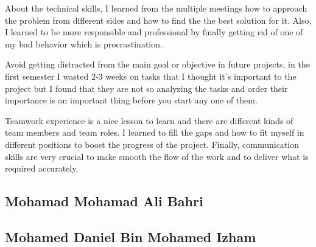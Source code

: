 \documentclass[../main.tex]{subfiles}
\begin{document}
About the technical skills, I learned from the multiple meetings how to 
approach the problem from different sides and how to find the 
the best solution for it. Also, I learned to be more responsible
and professional by finally getting rid of one of my bad behavior 
which is procrastination.

Avoid getting distracted from the main goal or objective in 
future projects, in the first semester I wasted 2-3 weeks 
on tasks that I thought it's important to the project but 
I found that they are not so analyzing the tasks and 
order their importance is an important thing before
you start any one of them.

Teamwork experience is a nice lesson to learn and 
there are different kinds of team members and team roles.
I learned to fill the gaps and how to fit myself in different 
positions to boost the progress of the project. 
Finally, communication skills are very crucial to make smooth 
the flow of the work and to deliver what is required accurately.

\subsection{Mohamad Mohamad Ali Bahri}

\lipsum[2]

\subsection{Mohamed Daniel Bin Mohamed Izham}

\lipsum[3]
\end{document}
